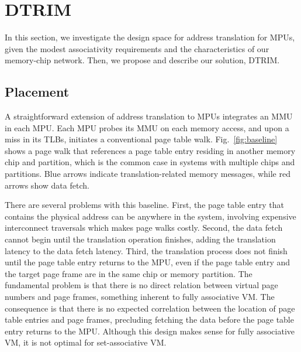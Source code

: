 \section{DTRIM}
\label{sec:msmmu}


In this section, we investigate the design space for address translation for MPUs, given the modest associativity requirements and the characteristics of our memory-chip network. Then, we propose and describe our solution, DTRIM.

\subsection{Placement}

A straightforward extension of address translation to MPUs integrates an MMU in each MPU. Each MPU probes its MMU on each memory access, and upon a miss in its TLBs, initiates a conventional page table walk. Fig.~\ref{fig:baseline} shows a page walk that references a page table entry residing in another memory chip and partition, which is the common case in systems with multiple chips and partitions. Blue arrows indicate translation-related memory messages, while red arrows show data fetch. %



There are several problems with this baseline. First, the page table entry that contains the physical address can be anywhere in the system, involving expensive interconnect traversals which makes page walks costly. Second, the data fetch cannot begin until the translation operation finishes, adding the translation latency to the data fetch latency. Third, the translation process does not finish until the page table entry returns to the MPU, even if the page table entry and the target page frame are in the same chip or memory partition. The fundamental problem is that there is no direct relation between virtual page numbers and page frames, something inherent to fully associative VM. The consequence is that there is no expected correlation between the location of page table entries and page frames, precluding fetching the data before the page table entry returns to the MPU. Although this design makes sense for fully associative VM, it is not optimal for set-associative VM.

